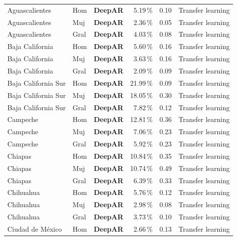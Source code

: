 \documentclass[12pt, letterpaper]{article}
\begin{document}
\begin{longtable}{l l >{\bfseries}c r r l}
Aguascalientes & Hom & \textcolor{cdeepar}{\textbf{DeepAR}} & 5.19\,\% & 0.10 & Transfer learning \\
Aguascalientes & Muj & \textcolor{cdeepar}{\textbf{DeepAR}} & 2.36\,\% & 0.05 & Transfer learning \\
Aguascalientes & Gral & \textcolor{cdeepar}{\textbf{DeepAR}} & 4.03\,\% & 0.08 & Transfer learning \\
Baja California & Hom & \textcolor{cdeepar}{\textbf{DeepAR}} & 5.60\,\% & 0.16 & Transfer learning \\
Baja California & Muj & \textcolor{cdeepar}{\textbf{DeepAR}} & 3.63\,\% & 0.16 & Transfer learning \\
Baja California & Gral & \textcolor{cdeepar}{\textbf{DeepAR}} & 2.09\,\% & 0.09 & Transfer learning \\
Baja California Sur & Hom & \textcolor{cdeepar}{\textbf{DeepAR}} & 21.99\,\% & 0.09 & Transfer learning \\
Baja California Sur & Muj & \textcolor{cdeepar}{\textbf{DeepAR}} & 18.05\,\% & 0.30 & Transfer learning \\
Baja California Sur & Gral & \textcolor{cdeepar}{\textbf{DeepAR}} & 7.82\,\% & 0.12 & Transfer learning \\
Campeche & Hom & \textcolor{cdeepar}{\textbf{DeepAR}} & 12.81\,\% & 0.36 & Transfer learning \\
Campeche & Muj & \textcolor{cdeepar}{\textbf{DeepAR}} & 7.06\,\% & 0.23 & Transfer learning \\
Campeche & Gral & \textcolor{cdeepar}{\textbf{DeepAR}} & 5.92\,\% & 0.23 & Transfer learning \\
Chiapas & Hom & \textcolor{cdeepar}{\textbf{DeepAR}} & 10.84\,\% & 0.35 & Transfer learning \\
Chiapas & Muj & \textcolor{cdeepar}{\textbf{DeepAR}} & 10.74\,\% & 0.49 & Transfer learning \\
Chiapas & Gral & \textcolor{cdeepar}{\textbf{DeepAR}} & 6.39\,\% & 0.33 & Transfer learning \\
Chihuahua & Hom & \textcolor{cdeepar}{\textbf{DeepAR}} & 5.76\,\% & 0.12 & Transfer learning \\
Chihuahua & Muj & \textcolor{cdeepar}{\textbf{DeepAR}} & 2.98\,\% & 0.08 & Transfer learning \\
Chihuahua & Gral & \textcolor{cdeepar}{\textbf{DeepAR}} & 3.73\,\% & 0.10 & Transfer learning \\
Ciudad de México & Hom & \textcolor{cdeepar}{\textbf{DeepAR}} & 2.66\,\% & 0.13 & Transfer learning \\

\end{longtable}
\end{document}
